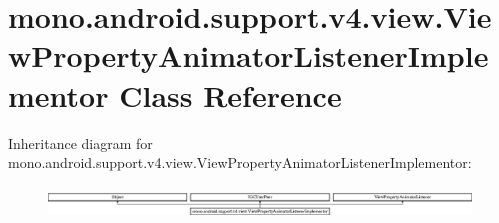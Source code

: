 \hypertarget{classmono_1_1android_1_1support_1_1v4_1_1view_1_1ViewPropertyAnimatorListenerImplementor}{}\section{mono.\+android.\+support.\+v4.\+view.\+View\+Property\+Animator\+Listener\+Implementor Class Reference}
\label{classmono_1_1android_1_1support_1_1v4_1_1view_1_1ViewPropertyAnimatorListenerImplementor}
Inheritance diagram for mono.\+android.\+support.\+v4.\+view.\+View\+Property\+Animator\+Listener\+Implementor\+:\begin{figure}[H]
\begin{center}
\leavevmode
\includegraphics[height=0.860215cm]{classmono_1_1android_1_1support_1_1v4_1_1view_1_1ViewPropertyAnimatorListenerImplementor}
\end{center}
\end{figure}
